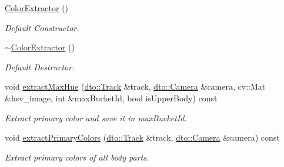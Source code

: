 \begin{DoxyCompactItemize}
\item 
\mbox{\label{classfeature__extraction_1_1_color_extractor_a4f04b7aaf025cf6439bcba92614a688c}} 
\mbox{\hyperlink{classfeature__extraction_1_1_color_extractor_a4f04b7aaf025cf6439bcba92614a688c}{Color\+Extractor}} ()
\begin{DoxyCompactList}\small\item\em Default Constructor. \end{DoxyCompactList}\item 
\mbox{\label{classfeature__extraction_1_1_color_extractor_af7762aaa61e1139b6ff72f4167b17586}} 
\mbox{\hyperlink{classfeature__extraction_1_1_color_extractor_af7762aaa61e1139b6ff72f4167b17586}{$\sim$\+Color\+Extractor}} ()
\begin{DoxyCompactList}\small\item\em Default Destructor. \end{DoxyCompactList}\item 
\mbox{\label{classfeature__extraction_1_1_color_extractor_a402a57b55c7928e2a9a35328140b4a5b}} 
void \mbox{\hyperlink{classfeature__extraction_1_1_color_extractor_a402a57b55c7928e2a9a35328140b4a5b}{extract\+Max\+Hue}} (\mbox{\hyperlink{structdto_1_1_track}{dto\+::\+Track}} \&track, \mbox{\hyperlink{structdto_1_1_camera}{dto\+::\+Camera}} \&camera, cv\+::\+Mat \&hsv\+\_\+image, int \&max\+Bucket\+Id, bool is\+Upper\+Body) const
\begin{DoxyCompactList}\small\item\em Extract primary color and save it in max\+Bucket\+Id. \end{DoxyCompactList}\item 
\mbox{\label{classfeature__extraction_1_1_color_extractor_a22cf54044ef732c3d2939ddc00da51a3}} 
void \mbox{\hyperlink{classfeature__extraction_1_1_color_extractor_a22cf54044ef732c3d2939ddc00da51a3}{extract\+Primary\+Colors}} (\mbox{\hyperlink{structdto_1_1_track}{dto\+::\+Track}} \&track, \mbox{\hyperlink{structdto_1_1_camera}{dto\+::\+Camera}} \&camera) const
\begin{DoxyCompactList}\small\item\em Extract primary colors of all body parts. \end{DoxyCompactList}\end{DoxyCompactItemize}


